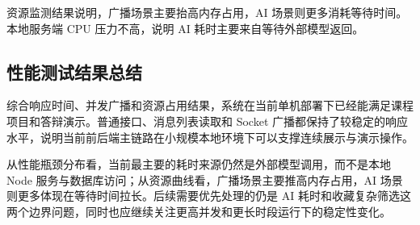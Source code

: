 资源监测结果说明，广播场景主要抬高内存占用，AI 场景则更多消耗等待时间。本地服务端 CPU 压力不高，说明 AI 耗时主要来自等待外部模型返回。

\subsection{性能测试结果总结}

综合响应时间、并发广播和资源占用结果，系统在当前单机部署下已经能满足课程项目和答辩演示。普通接口、消息列表读取和 Socket 广播都保持了较稳定的响应水平，说明当前前后端主链路在小规模本地环境下可以支撑连续展示与演示操作。

从性能瓶颈分布看，当前最主要的耗时来源仍然是外部模型调用，而不是本地 Node 服务与数据库访问；从资源曲线看，广播场景主要推高内存占用，AI 场景则更多体现在等待时间拉长。后续需要优先处理的仍是 AI 耗时和收藏复杂筛选这两个边界问题，同时也应继续关注更高并发和更长时段运行下的稳定性变化。
